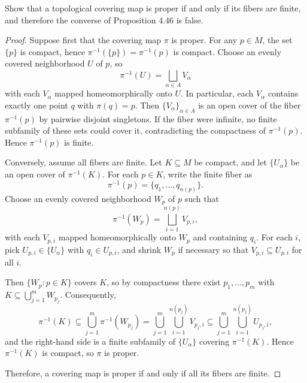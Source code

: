 \begin{problem}
    Show that a topological covering map is proper if and only if its fibers are finite, 
    and therefore the converse of Proposition 4.46 is false.
    \begin{proof}
    Suppose first that the covering map $\pi$ is proper. For any $p\in M$, the set $\{p\}$ is compact, hence $\pi^{-1}(\{p\})=\pi^{-1}(p)$ is compact. Choose an evenly covered neighborhood $U$ of $p$, so
    \[
    \pi^{-1}(U)=\bigsqcup_{\alpha\in A} V_\alpha
    \]
    with each $V_\alpha$ mapped homeomorphically onto $U$. In particular, each $V_\alpha$ contains exactly one point $q$ with $\pi(q)=p$. Then $\{V_\alpha\}_{\alpha\in A}$ is an open cover of the fiber $\pi^{-1}(p)$ by pairwise disjoint singletons. If the fiber were infinite, no finite subfamily of these sets could cover it, contradicting the compactness of $\pi^{-1}(p)$. Hence $\pi^{-1}(p)$ is finite.

    Conversely, assume all fibers are finite. Let $K\subseteq M$ be compact, and let $\{U_\alpha\}$ be an open cover of $\pi^{-1}(K)$. For each $p\in K$, write the finite fiber as
    \[
    \pi^{-1}(p)=\{q_1,\dots,q_{n(p)}\}.
    \]
    Choose an evenly covered neighborhood $W_p$ of $p$ such that
    \[
    \pi^{-1}(W_p)=\bigsqcup_{i=1}^{n(p)} V_{p,i},
    \]
    with each $V_{p,i}$ mapped homeomorphically onto $W_p$ and containing $q_i$. For each $i$, pick $U_{p,i}\in\{U_\alpha\}$ with $q_i\in U_{p,i}$, and shrink $W_p$ if necessary so that $V_{p,i}\subseteq U_{p,i}$ for all $i$.

    Then $\{W_p:p\in K\}$ covers $K$, so by compactness there exist $p_1,\dots,p_m$ with $K\subseteq\bigcup_{j=1}^m W_{p_j}$. Consequently,
    \[
    \pi^{-1}(K)\subseteq \bigcup_{j=1}^m \pi^{-1}(W_{p_j})
    = \bigcup_{j=1}^m \bigcup_{i=1}^{n(p_j)} V_{p_j,i}
    \subseteq \bigcup_{j=1}^m \bigcup_{i=1}^{n(p_j)} U_{p_j,i},
    \]
    and the right-hand side is a finite subfamily of $\{U_\alpha\}$ covering $\pi^{-1}(K)$. Hence $\pi^{-1}(K)$ is compact, so $\pi$ is proper.

    Therefore, a covering map is proper if and only if all its fibers are finite.
    \end{proof}
\end{problem}

